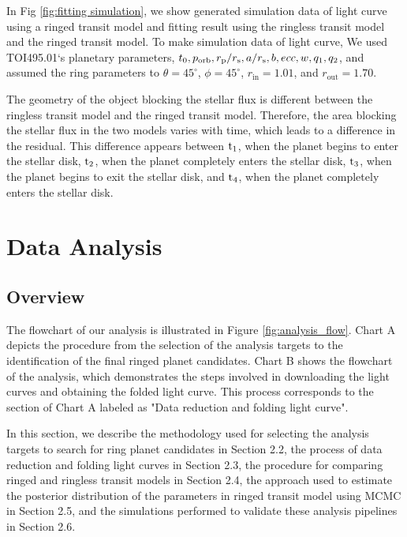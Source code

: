\documentclass[fleqn,usenatbib, onecolumn,dvipdfmx]{mnras}
\begin{document}
In Fig \ref{fig:fitting simulation}, we show generated simulation data of light curve using a ringed transit model and fitting result using the ringless transit model and the ringed transit model.
To make simulation data of light curve, We used TOI495.01`s planetary parameters, $t_0, p_{\rm{orb}}, r_{\rm{p}}/r_{\rm{s}}, a/r_{\rm{s}}, b, ecc, w, q_1, q_2$, and assumed the ring parameters to $\theta=45^\circ$, $\phi=45^\circ$, $r_{\text{in}}=1.01$, and $r_{\text{out}}=1.70$.

The geometry of the object blocking the stellar flux is different between the ringless transit model and the ringed transit model. Therefore, the area blocking the stellar flux in the two models varies with time, which leads to a difference in the residual.
This difference appears between $\rm{t}_1$, when the planet begins to enter the stellar disk, $\rm{t}_2$, when the planet completely enters the stellar disk, $\rm{t}_3$, when the planet begins to exit the stellar disk, and $\rm{t}_4$, when the planet completely enters the stellar disk.



\section{Data Analysis}
\subsection{Overview} \label{Overview}
The flowchart of our analysis is illustrated in Figure \ref{fig:analysis_flow}. Chart A depicts the procedure from the selection of the analysis targets to the identification of the final ringed planet candidates. Chart B shows the flowchart of the analysis, which demonstrates the steps involved in downloading the light curves and obtaining the folded light curve.  This process corresponds to the section of Chart A labeled as "Data reduction and folding light curve".

In this section, we describe the methodology used for selecting the analysis targets to search for ring planet candidates in Section 2.2, the process of data reduction and folding light curves in Section 2.3, the procedure for comparing ringed and ringless transit models in Section 2.4, the approach used to estimate the posterior distribution of the parameters in ringed transit model using MCMC in Section 2.5, and the simulations performed to validate these analysis pipelines in Section 2.6.
\end{document}
